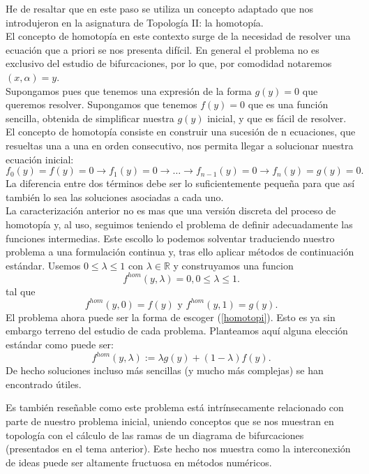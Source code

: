 He de resaltar que en este paso se utiliza un concepto adaptado que nos introdujeron en la asignatura de Topología II: la homotopía. \\
El concepto de homotopía en este contexto surge de la necesidad de resolver una ecuación que a priori se nos presenta difícil. En general el problema no es exclusivo del estudio de bifurcaciones, por lo que, por comodidad notaremos $(x,\alpha)=y$.\\
Supongamos pues que tenemos una expresión de la forma $g(y)=0$ que queremos resolver.
Supongamos que tenemos $f(y)=0$ que es una función sencilla, obtenida de simplificar nuestra $g(y)$ inicial, y que es fácil de resolver. El concepto de homotopía consiste en construir una sucesión de n ecuaciones, que resueltas una a una en orden consecutivo, nos permita llegar a solucionar nuestra ecuación inicial:
\[ f_{0}(y)=f(y)=0\rightarrow f_{1}(y)=0\rightarrow\dots \rightarrow f_{n-1}(y)=0 \rightarrow f_{n}(y)=g(y)=0. \]
La diferencia entre dos términos debe ser lo suficientemente pequeña para que así también lo sea las soluciones asociadas a cada uno.\\
La caracterización anterior no es mas que una versión discreta del proceso de homotopía y, al uso, seguimos teniendo el problema de definir adecuadamente las funciones intermedias. Este escollo lo podemos solventar traduciendo nuestro problema a una formulación continua y, tras ello aplicar métodos de continuación estándar. 
Usemos $0 \leq\lambda\leq 1$ con $\lambda \in \mathbb{R}$ y construyamos una funcion
\begin{equation}
f^{hom}(y,\lambda)=0,0 \leq\lambda\leq 1. 
\label{homotopi}
\end{equation} 
tal que 
\[ f^{hom}(y,0)=f(y) \text{ y } f^{hom}(y,1)=g(y). \]
El problema ahora puede ser la forma de escoger (\ref{homotopi}). Esto es ya sin embargo terreno del estudio de cada problema. Planteamos aquí alguna elección estándar como puede ser:
\begin{equation}
f^{hom}(y,\lambda):=\lambda g(y)+(1-\lambda)f(y).
\label{homotopi2}
\end{equation} 
De hecho soluciones incluso más sencillas (y mucho más complejas) se han encontrado útiles\cite{allgower}.

Es también reseñable como este problema está intrínsecamente relacionado con parte de  nuestro problema inicial, uniendo conceptos que se nos muestran en topología con el cálculo de las ramas de un diagrama de bifurcaciones (presentados en el tema anterior). Este hecho nos muestra como la interconexión de ideas puede ser altamente fructuosa en métodos numéricos.
